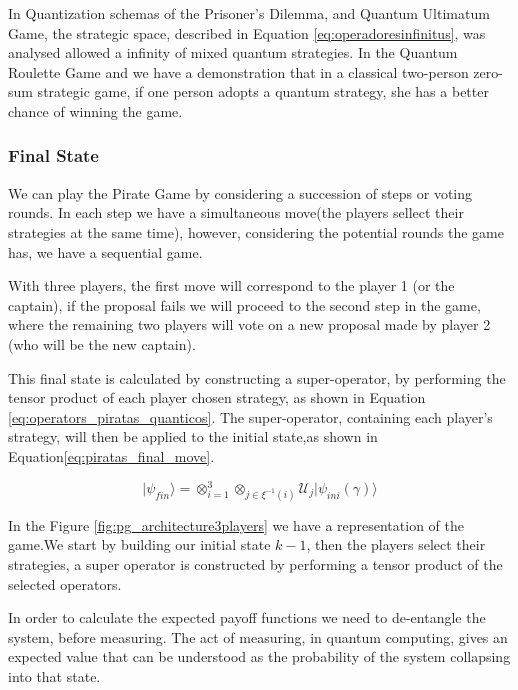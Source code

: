 In Quantization schemas of the Prisoner's Dilemma\cite{Letters2002}\cite{Eisert2008}, and Quantum Ultimatum Game\cite{Fra2011}, the strategic space, described in Equation \ref{eq:operadoresinfinitus}, was analysed allowed a infinity of mixed quantum strategies. In the Quantum Roulette Game\cite{Salimi2009} and \cite{Meyer1999} we have a demonstration that in a classical two-person zero-sum strategic game, if one person adopts a quantum strategy, she has a better chance of winning the game. 



\subsubsection{Final State}
\label{subsec:pirates_finalstate}

We can play the Pirate Game by considering a succession of steps or voting rounds. In each step we have a simultaneous move(the players sellect their strategies at the same time), however, considering the potential rounds the game has, we have a sequential game. 

With three players, the first move will correspond to the player 1 (or the captain), if the proposal fails we will proceed to the second step in the game, where the remaining two players will vote on a new proposal made by player 2 (who will be the new captain). 

This final state is calculated by constructing a super-operator, by performing the tensor product of each player chosen strategy, as shown in Equation \ref{eq:operators_piratas_quanticos}. The super-operator, containing each player's strategy, will then be applied to the initial state,as shown in Equation\ref{eq:piratas_final_move}.

\begin{equation}
\vert\psi_{fin}\rangle=\otimes_{i=1}^{3}\otimes_{j\in\xi^{-1}(i)}\mathcal{U}_{j}\vert\psi_{ini}(\gamma)\rangle
\label{eq:piratas_final_move}
\end{equation}

In the Figure \ref{fig:pg_architecture3players} we have a representation of the game.We start by building our initial state $k-1$, then the players  select their strategies, a super operator is constructed by performing a tensor product of the selected operators. 

In order to calculate the expected payoff functions we need to de-entangle the system, before measuring. The act of measuring, in quantum computing, gives an expected value that can be understood as the probability of the system collapsing into that state. 

